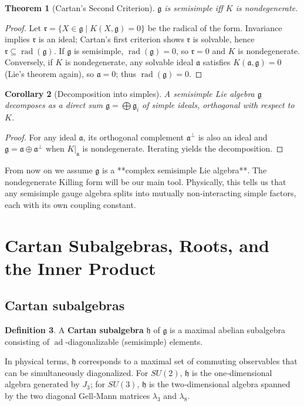 \documentclass{article}
\newtheorem{theorem}{Theorem}[section]
\newtheorem{corollary}[theorem]{Corollary}
\theoremstyle{definition}
\newtheorem{definition}[theorem]{Definition}
\theoremstyle{remark}
\newcommand{\ad}{\operatorname{ad}}
\newcommand{\K}{K}
\newcommand{\g}{\mathfrak{g}}
\newcommand{\h}{\mathfrak{h}}
\newcommand{\rad}{\operatorname{rad}}
\begin{document}
\begin{theorem}[Cartan’s Second Criterion]
$\g$ is semisimple iff $\K$ is nondegenerate.
\end{theorem}
\begin{proof}
Let $\mathfrak{r} = \{X\in\g\mid \K(X,\g)=0\}$ be the radical of the form.
Invariance implies $\mathfrak{r}$ is an ideal; Cartan’s first criterion shows
$\mathfrak{r}$ is solvable, hence $\mathfrak{r}\subseteq\rad(\g)$.
If $\g$ is semisimple, $\rad(\g)=0$, so $\mathfrak{r}=0$ and $\K$ is nondegenerate.
Conversely, if $\K$ is nondegenerate, any solvable ideal $\mathfrak{a}$ satisfies
$\K(\mathfrak{a},\g)=0$ (Lie’s theorem again), so $\mathfrak{a}=0$; thus
$\rad(\g)=0$.
\end{proof}

\begin{corollary}[Decomposition into simples]
A semisimple Lie algebra $\g$ decomposes as a direct sum $\g = \bigoplus \g_i$
of simple ideals, orthogonal with respect to $\K$.
\end{corollary}
\begin{proof}
For any ideal $\mathfrak{a}$, its orthogonal complement $\mathfrak{a}^\perp$
is also an ideal and $\g = \mathfrak{a}\oplus\mathfrak{a}^\perp$ when $\K|_{\mathfrak{a}}$
is nondegenerate.  Iterating yields the decomposition.
\end{proof}

From now on we assume $\g$ is a **complex semisimple Lie algebra**.
The nondegenerate Killing form will be our main tool.
Physically, this tells us that any semisimple gauge algebra splits into
mutually non‑interacting simple factors, each with its own coupling constant.

\section{Cartan Subalgebras, Roots, and the Inner Product}

\subsection{Cartan subalgebras}
\begin{definition}
A \textbf{Cartan subalgebra} $\h$ of $\g$ is a maximal abelian subalgebra consisting
of $\ad$-diagonalizable (semisimple) elements.
\end{definition}
In physical terms, $\h$ corresponds to a maximal set of commuting observables
that can be simultaneously diagonalized. For $SU(2)$, $\h$ is the one‑dimensional
algebra generated by $J_3$; for $SU(3)$, $\h$ is the two‑dimensional algebra
spanned by the two diagonal Gell‑Mann matrices $\lambda_3$ and $\lambda_8$.
\end{document}
